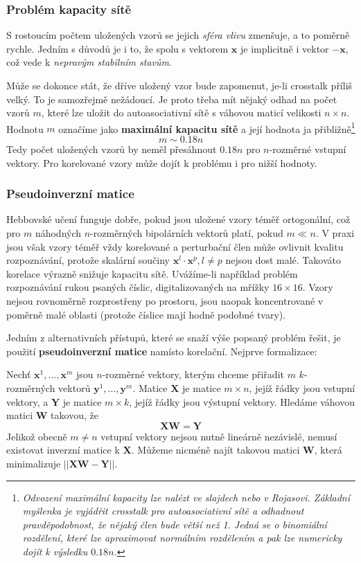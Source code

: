 \documentclass[11pt]{report} %
\renewcommand{\vec}[1]{\mathbf{#1}}
\numberwithin{equation}{section}
\begin{document}
\subsubsection{Problém kapacity sítě}
S rostoucím počtem uložených vzorů se jejich \textit{sféra vlivu} zmenšuje, a to poměrně rychle. Jedním s důvodů je i to, že spolu s vektorem $\vec{x}$ je implicitně  i vektor $-\vec{x}$, což vede k \textit{nepravým stabilním stavům}.

Může se dokonce stát, že dříve uložený vzor bude zapomenut, je-li crosstalk příliš velký. To je samozřejmě nežádoucí. Je proto třeba mít nějaký odhad na počet vzorů $m$, které lze  uložit do autoasociativní sítě s váhovou maticí velikosti $n \times n$. Hodnotu $m$ označíme jako \textbf{maximální kapacitu sítě} a její hodnota ja přibližně\footnote{\textit{Odvození maximální kapacity lze nalézt ve slajdech nebo v Rojasovi. Základní myšlenka je vyjádřit crosstalk pro autoasociativní sítě a odhadnout pravděpodobnost, že nějaký člen bude větší než 1. Jedná se o binomiální rozdělení, které lze aproximovat normálním rozdělením a pak lze numericky dojít k výsledku $0.18n$.}}
$$m \sim 0.18n$$
Tedy počet uložených vzorů by neměl přesáhnout $0.18n$ pro $n$-rozměrné vstupní vektory. Pro korelované vzory může dojít k problému i pro nižší hodnoty.

\subsubsection{Pseudoinverzní matice}
Hebbovské učení funguje dobře, pokud jsou uložené vzory téměř ortogonální, což pro $m$ náhodných $n$-rozměrných bipolárních vektorů platí, pokud $m \ll n$. V praxi jsou však vzory téměř vždy korelované a perturbační člen může ovlivnit kvalitu rozpoznávání, protože skalární součiny $\vec{x}^l \cdot \vec{x}^p, l \neq p$ nejsou dost malé. Takováto korelace výrazně snižuje kapacitu sítě. Uvážíme-li například problém rozpoznávání rukou psaných číslic, digitalizovaných na mřížky $16 \times 16$. Vzory nejsou rovnoměrně rozprostřeny po prostoru, jsou naopak koncentrované v poměrně malé oblasti (protože číslice mají hodně podobné tvary).

Jedním z alternativních přístupů, které se snaží výše popsaný problém řešit, je použití \textbf{pseudoinverzní matice} namísto korelační. Nejprve formalizace:

Nechť $\vec{x}^1, \dots, \vec{x}^m$ jsou $n$-rozměrné vektory, kterým chceme přiřadit $m$ $k$-rozměrných vektorů $\vec{y}^1, \dots, \vec{y}^m$. Matice $\vec{X}$ je matice $m \times n$, jejíž řádky jsou vstupní vektory, a $\vec{Y}$ je matice $m \times k$, jejíž řádky jsou výstupní vektory. Hledáme váhovou matici $\vec{W}$ takovou, že
$$\vec{X}\vec{W} = \vec{Y}$$
Jelikož obecně $m \neq n$ vstupní vektory nejsou nutně lineárně nezávislé, nemusí existovat inverzní matice k $\vec{X}$. Můžeme nicméně najít takovou matici $\vec{W}$, která minimalizuje $||\vec{X}\vec{W} - \vec{Y}||$. 
\end{document}
